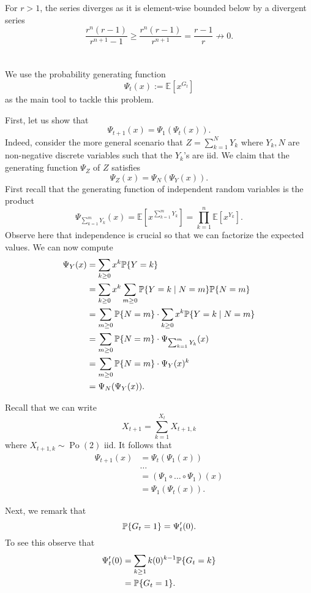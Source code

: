 \documentclass[10pt]{article}
\DeclarePairedDelimiter{\set}{\lbrace}{\rbrace}
\DeclareMathOperator{\Po}{Po}
\newcommand{\E}{\mathbb{E}}
\renewcommand{\P}{\mathbb{P}}
\begin{document}
For $r > 1$,
the series diverges as it is element-wise bounded below by a divergent series
\[
  \frac{r^n (r-1)}{r^{n+1} - 1}
  \geq \frac{r^n (r-1)}{r^{n+1}}
  = \frac{r-1}{r}
  \not\to 0.
\]

\clearpage
\section{}
We use the probability generating function
\[
  \Psi_t(x)
  := \E\left[ x^{G_t} \right]
\]
as the main tool to tackle this problem.

First,
let us show that
\[
  \Psi_{t+1}(x) = \Psi_1(\Psi_t(x)).
\]
Indeed,
consider the more general scenario that $Z = \sum_{k=1}^N Y_k$
where $Y_k, N$ are non-negative discrete variables
such that the $Y_k$'s are iid.
We claim that the generating function $\Psi_Z$ of $Z$ satisfies
\[
  \Psi_Z(x) = \Psi_N(\Psi_Y(x)).
\]
First recall that the generating function of independent random variables is the product
\[
  \Psi_{\sum_{k=1}^m Y_k}(x)
  = \E\left[ x^{\sum_{k=1}^m Y_k} \right]
  = \prod_{k=1}^n \E\left[ x^{Y_k} \right].
\]
Observe here that independence is crucial so that we can factorize the expected values.
We can now compute
\begin{align*}
  \Psi_Y(x)
  &= \sum_{k\geq 0} x^k \P\set{Y = k} \\
  &= \sum_{k\geq 0} x^k \sum_{m\geq 0} \P\set{Y = k\mid N=m}\P\set{N=m} \\
  &= \sum_{m\geq 0} \P\set{N=m}\cdot \sum_{k\geq 0} x^k \P\set{Y = k\mid N=m} \\
  &= \sum_{m\geq 0} \P\set{N=m}\cdot \Psi_{\sum_{k=1}^m Y_k}(x) \\
  &= \sum_{m\geq 0} \P\set{N=m}\cdot \Psi_Y(x)^k \\
  &= \Psi_N(\Psi_Y(x)).
\end{align*}

Recall that we can write
\[
  X_{t+1} = \sum_{k=1}^{X_t} X_{t+1, k}
\]
where $X_{t+1, k}\sim \Po(2)$ iid.
It follows that
\begin{align*}
  \Psi_{t+1}(x)
  &= \Psi_t(\Psi_1(x)) \\
  &\dots \\
  &= (\Psi_1\circ \dots\circ \Psi_1) (x) \\
  &= \Psi_1(\Psi_t(x)).
\end{align*}

Next,
we remark that
\[
  \P\set{G_t=1} = \Psi_t'(0).
\]
To see this observe that
\begin{align*}
  \Psi_t'(0)
  &= \sum_{k\geq 1} k(0)^{k-1} \P\set{G_t=k} \\
  &= \P\set{G_t=1}.
\end{align*}
\end{document}
